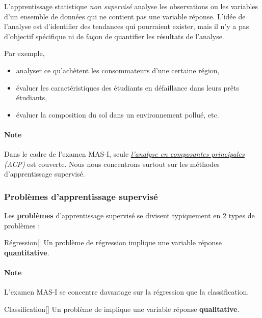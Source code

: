 \documentclass[french]{article}
\begin{document}
\begin{multicols*}{2}
\begin{definitionNOHFILLsub}
L'apprentissage statistique \textit{non supervisé} analyse les observations ou les variables d'un ensemble de données qui ne contient pas une variable réponse. L'idée de l'analyse est d'identifier des tendances qui pourraient exister, mais il n'y a pas d'objectif spécifique ni de façon de quantifier les résultats de l'analyse.

\bigskip

Par exemple,
\begin{itemize}
	\item	analyser ce qu'achètent les consommateurs d'une certaine région,
	\item	évaluer les caractéristiques des étudiants en défaillance dans leurs prêts étudiants,
	\item	évaluer la composition du sol dans un environnement pollué, etc.
\end{itemize}
\end{definitionNOHFILLsub}

\paragraph{Note}	Dans le cadre de l'examen MAS-I, seule \textit{\underline{\hyperref[sec:PCA]{l'analyse en composantes principales}} (ACP)} est couverte. Nous nous concentrons surtout sur les méthodes d'apprentissage supervisé.



\subsubsection{Problèmes d'apprentissage supervisé}
Les \textbf{problèmes} d'apprentissage supervisé se divisent typiquement en 2 types de problèmes : 

\begin{definitionGENERAL}{Régression}[]
Un problème de régression implique une variable réponse \textbf{quantitative}. 

\paragraph{Note}	L'examen MAS-I se concentre davantage sur la régression que la classification. 
\end{definitionGENERAL}

\begin{definitionGENERAL}{Classification}[]
Un problème de \textit{\underline{}} implique une variable réponse \textbf{qualitative}. 
\end{definitionGENERAL}


\end{multicols*}
\end{document}
